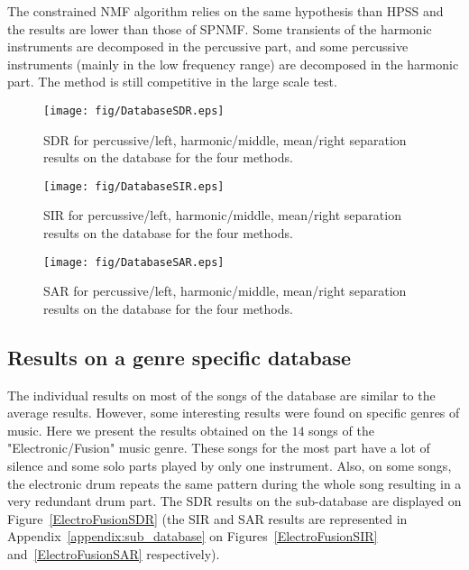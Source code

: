 The constrained NMF algorithm relies on the same hypothesis than HPSS and the results are lower than those of SPNMF. Some transients of the harmonic instruments are decomposed in the percussive part, and some percussive instruments (mainly in the low frequency range) are decomposed in the harmonic part. The method is still competitive in the large scale test. 



\begin{figure}[h]

  \centering 
  \texttt{[image: fig/DatabaseSDR.eps]}
  \caption{\label{DatabaseSDR} SDR for percussive/left, harmonic/middle, mean/right separation results on the database for the four methods.}
  
\end{figure}

\begin{figure}[h]

  \centering 
  \texttt{[image: fig/DatabaseSIR.eps]}
  \caption{\label{DatabaseSIR} SIR for percussive/left, harmonic/middle, mean/right separation results on the database for the four methods.}
  
\end{figure}

\begin{figure}[h]

  \centering 
  \texttt{[image: fig/DatabaseSAR.eps]}
  \caption{\label{DatabaseSAR} SAR for percussive/left, harmonic/middle, mean/right separation results on the database for the four methods.}
  
\end{figure}




\subsection{Results on a genre specific database}
\label{sec:subdata}

The individual results on most of the songs of the database are similar to the average results. However, some interesting results were found on specific genres of music. Here we present the results obtained on the $14$ songs of the "Electronic/Fusion" music genre. These songs for the most part have a lot of silence and some solo parts played by only one instrument. Also, on some songs, the electronic drum repeats the same pattern during the whole song resulting in a very redundant drum part. The SDR results on the sub-database are displayed on Figure~\ref{ElectroFusionSDR} (the SIR and SAR results are represented in Appendix~\ref{appendix:sub_database} on Figures~\ref{ElectroFusionSIR} and~\ref{ElectroFusionSAR} respectively). 

